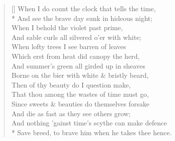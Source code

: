 \documentclass[MAIN]{subfiles}
\begin{document}
\settowidth{\versewidth}{The silver swan, who, living, had no note,}
\begin{verse}[\versewidth]
When I do count the clock that tells the time,\\*
\vin And see the brave day sunk in hideous night;\\
When I behold the violet past prime,\\
\vin And sable curls all silvered o'er with white;\\
When lofty trees I see barren of leaves\\
\vin Which erst from heat did canopy the herd,\\
And summer's green all girded up in sheaves\\
\vin Borne on the bier with white \& bristly beard,\\
Then of thy beauty do I question make,\\
\vin That thou among the wastes of time must go,\\
Since sweets \& beauties do themselves forsake\\
\vin And die as fast as they see others grow;\\
And nothing 'gainst time's scythe can make defence\\*
Save breed, to brave him when he takes thee hence.
\end{verse}
\end{document}
